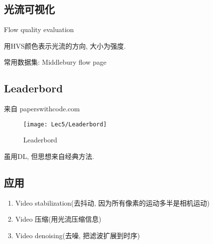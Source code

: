 \subsection{光流可视化}Flow quality evaluation

用HVS颜色表示光流的方向, 大小为强度. 

常用数据集: Middlebury flow page

\subsection{Leaderbord}

来自 paperswithcode.com 

\begin{figure}[H]
    \centering
    \texttt{[image: Lec5/Leaderbord]}
    \caption{Leaderbord}
\end{figure}

虽用DL, 但思想来自经典方法. 

\subsection{应用}
\begin{enumerate}
    \item Video stabilization(去抖动, 因为所有像素的运动多半是相机运动)
    \item Video 压缩(用光流压缩信息)
    \item Video denoising(去噪, 把滤波扩展到时序)
\end{enumerate}
